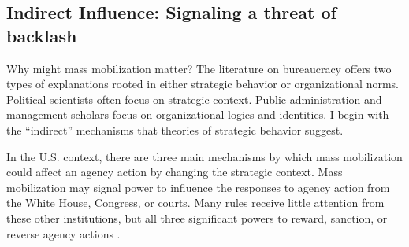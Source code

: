 \subsection{Indirect Influence: Signaling a threat of backlash}
Why might mass mobilization matter? The literature on bureaucracy offers two types of explanations rooted in either strategic behavior or organizational norms. Political scientists often focus on strategic context. Public administration and management scholars focus on organizational logics and identities. I begin with the ``indirect'' mechanisms that theories of strategic behavior suggest. 

In the U.S. context, there are three main mechanisms by which mass mobilization could affect an agency action by changing the strategic context. 
Mass mobilization may signal power to influence the responses to agency action from the White House, Congress, or courts. Many rules receive little attention from these other institutions, but all three significant powers to reward, sanction, or reverse agency actions \citep{Yaver2016}. 

% 


